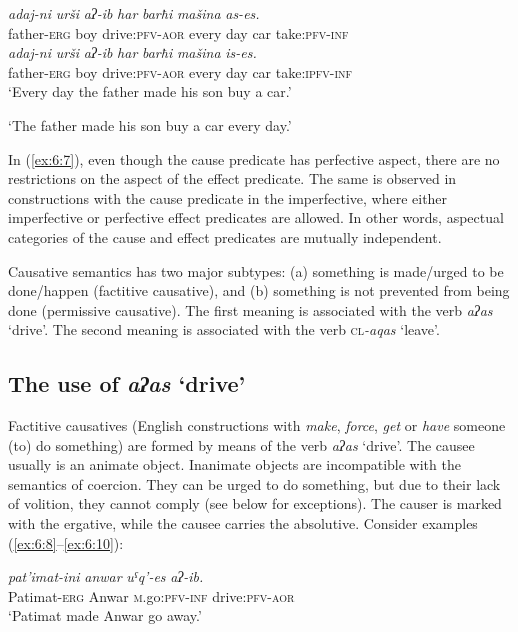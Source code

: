 ﻿\documentclass[output=paper]{langsci/langscibook}
\begin{document}
\ea \label{ex:6:7} %
\ea %
\gll \emph{adaj-ni}  \emph{urši}  \emph{aʔ-ib} \emph{har} \emph{barħi} \emph{mašina} \emph{as-es.} \\
father-\textsc{erg} boy  drive:\textsc{pfv}-\textsc{aor} every day car take:\textsc{pfv}-\textsc{inf} \\

\ex %
\gll \emph{adaj-ni}  \emph{urši}  \emph{aʔ-ib} \emph{har} \emph{barħi} \emph{mašina} \emph{is-es.}\\
father-\textsc{erg} boy  drive:\textsc{pfv}-\textsc{aor} every day car take:\textsc{ipfv}-\textsc{inf}  \\


\glt `Every day the father made his son buy a car.'

`The father made his son buy a car every day.'
\z
\z

In (\ref{ex:6:7}), even though the cause predicate has perfective aspect,
there are no restrictions on the aspect of the effect predicate. The
same is observed in constructions with the cause predicate in the
imperfective, where either imperfective or perfective effect predicates
are allowed. In other words, aspectual categories of the cause and effect
predicates are mutually independent.

Causative semantics has two major subtypes: (a) something is made/urged
to be done/happen (factitive causative), and (b) something is not
prevented from being done (permissive causative). The first meaning is
associated with the verb \emph{aʔas} `drive'. The second meaning is
associated with the verb \textsc{cl}\emph{-aqas} `leave'.


\subsection{The use of \emph{aʔas} `drive'}

Factitive causatives (English constructions with \emph{make},
\emph{force}, \emph{get} or \emph{have} someone (to) do something) are
formed by means of the verb \emph{aʔas} `drive'. The causee usually is
an animate object. Inanimate objects are incompatible with the semantics
of coercion. They can be urged to do something, but due to their lack of volition, they cannot comply (see below for
exceptions). The causer is marked with the ergative, while the causee
carries the absolutive. Consider examples (\ref{ex:6:8}–\ref{ex:6:10}):

\ea \label{ex:6:8} %
\gll \emph{pat'imat-ini} \emph{anwar} \emph{uˤq'-es} \emph{aʔ-ib.} \\
 Patimat-\textsc{erg} Anwar \textsc{m}.go:\textsc{pfv}-\textsc{inf} drive:\textsc{pfv}-\textsc{aor} \\
\glt `Patimat made Anwar go away.'
\end{document}
